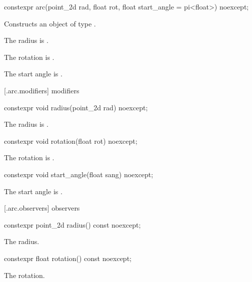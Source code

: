 %
\begin{itemdecl}
constexpr arc(point_2d rad, float rot,
  float start_angle = pi<float>) noexcept;
\end{itemdecl}
\begin{itemdescr}
\pnum
\effects
Constructs an object of type .

\pnum
The radius is .

\pnum
The rotation is .

\pnum
The start angle is .
\end{itemdescr}

 [\iotwod.arc.modifiers]{ modifiers}

%
\begin{itemdecl}
constexpr void radius(point_2d rad) noexcept;
\end{itemdecl}
\begin{itemdescr}
\pnum
\effects
The radius is .
\end{itemdescr}

%
\begin{itemdecl}
constexpr void rotation(float rot) noexcept;
\end{itemdecl}
\begin{itemdescr}
\pnum
\effects
The rotation is .
\end{itemdescr}

%
\begin{itemdecl}
constexpr void start_angle(float sang) noexcept;
\end{itemdecl}
\begin{itemdescr}
\pnum
\effects
The start angle is .
\end{itemdescr}

 [\iotwod.arc.observers]{ observers}

%
\begin{itemdecl}
constexpr point_2d radius() const noexcept;
\end{itemdecl}
\begin{itemdescr}
\pnum
\returns
The radius.
\end{itemdescr}

%
\begin{itemdecl}
constexpr float rotation() const noexcept;
\end{itemdecl}
\begin{itemdescr}
\pnum
\returns
The rotation.
\end{itemdescr}

